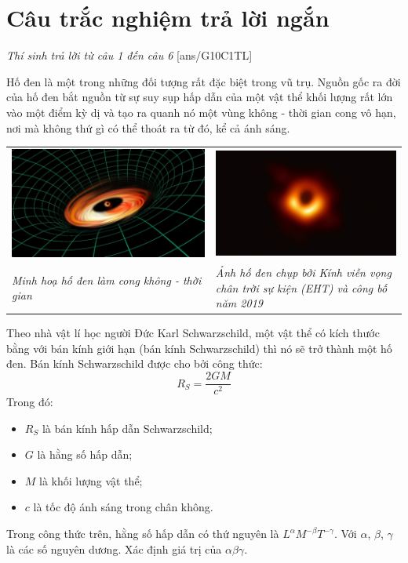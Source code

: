 \section{Câu trắc nghiệm trả lời ngắn} \textit{Thí sinh trả lời từ câu 1 đến câu 6}
\setcounter{ex}{0}
[ans/G10C1TL]
\begin{ex}
Hố đen là một trong những đối tượng rất đặc biệt trong vũ trụ. Nguồn gốc ra đời của hố đen bắt nguồn từ sự suy sụp hấp dẫn của một vật thể khối lượng rất lớn vào một điểm kỳ dị và tạo ra quanh nó một vùng không - thời gian cong vô hạn, nơi mà không thứ gì có thể thoát ra từ đó, kể cả ánh sáng. 
\begin{center}
	\begin{tabular}{M{7.5cm}M{7.5cm}}
		\includegraphics[width=0.7\linewidth]{figs/G10-CHUONG1-4}
		&\includegraphics[width=0.7\linewidth]{figs/G10-CHUONG1-5}\\
		\textit{Minh hoạ hố đen làm cong không - thời gian}& \textit{Ảnh hố đen chụp bởi Kính viễn vọng chân trời sự kiện (EHT) và công bố năm 2019} 
	\end{tabular}
\end{center}
Theo nhà vật lí học người Đức Karl Schwarzschild, một vật thể có kích thước bằng với bán kính giới hạn (bán kính Schwarzschild) thì nó sẽ trở thành một hố đen. Bán kính  Schwarzschild được cho bởi công thức:
$$R_S=\dfrac{2GM}{c^2}$$
Trong đó:
\begin{itemize}
	\item $R_S$ là bán kính hấp dẫn Schwarzschild;
	\item $G$ là hằng số hấp dẫn;
	\item $M$ là khối lượng vật thể;
	\item $c$ là tốc độ ánh sáng trong chân không.
\end{itemize}
Trong công thức trên, hằng số hấp dẫn có thứ nguyên là $L^\alpha M^{-\beta}T^{-\gamma}$. Với $\alpha$, $\beta$, $\gamma$ là các số nguyên dương. Xác định giá trị của $\alpha\beta\gamma$.


\end{ex}
